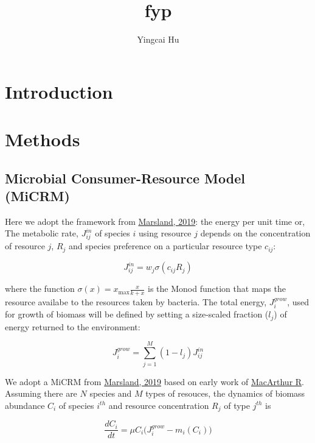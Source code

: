 \documentclass{article}
\title{fyp}
\author{Yingcai Hu}
\begin{document}
\maketitle

\section{Introduction}

\section{Methods}
\subsection{Microbial Consumer-Resource Model (MiCRM)}

Here we adopt the framework from \href{https://journals.plos.org/ploscompbiol/articleid=10.1371/journal.pcbi.1006793}{Marsland, 2019}: the energy per unit time or, The metabolic rate, $J^{in}_{ij}$ of species $i$ using resource $j$ depends on the concentration of resource $j$, $R_j$ and species preference on a particular resource type $c_{ij}$:

\begin{equation}
    J^{in}_{ij} = w_{j} \sigma(c_{ij} R_j)
\end{equation}


where the function $\sigma(x) = x_{\max} \frac{x}{k + x}$ is the Monod function that maps the resource availabe to the resources taken by bacteria. The total energy, $ J^{grow}_i $, used for growth of biomass will be defined by setting a size-scaled fraction ($l_{j}$) of energy returned to the environment:

\begin{equation}
    J^{grow}_{i} = \sum^M_{j=1} (1-l_{j}) J^{in}_{ij}
\end{equation}

We adopt a MiCRM from \href{https://journals.plos.org/ploscompbiol/articleid=10.1371/journal.pcbi.1006793}{Marsland, 2019} based on early work of \href{https://doi.org/10.1016/0040-5809(70)90039-0}{MacArthur R}. 
Assuming there are $N$ species and $M$ types of resouces,
the dynamics of biomass abundance $C_i$ of species $i^{th}$ and resource concentration $R_j$ of type $j^{th}$  is

\begin{equation} 
    \frac{dC_i}{dt} = \mu C_i \bigg ( J^{grow}_i  - m_i(C_i) \bigg )
\end{equation}
\end{document}
